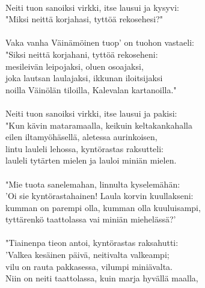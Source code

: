                                                                 \\
Neiti tuon sanoiksi virkki, itse lausui ja kysyvi:              \\
"Miksi neittä korjahasi, tyttöä rekosehesi?"                    \\
                                                                \\
Vaka vanha Väinämöinen tuop' on tuohon vastaeli:                \\
"Siksi neittä korjahani, tyttöä rekoseheni:                     \\
mesileivän leipojaksi, oluen osoajaksi,                         \\
joka lautsan laulajaksi, ikkunan iloitsijaksi                   \\
noilla Väinölän tiloilla, Kalevalan kartanoilla."               \\
                                                                \\
Neiti tuon sanoiksi virkki, itse lausui ja pakisi:              \\
"Kun kävin mataramaalla, keikuin keltakankahalla                \\
eilen iltamyöhäsellä, aletessa aurinkoisen,                     \\
lintu lauleli lehossa, kyntörastas raksutteli:                  \\
lauleli tytärten mielen ja lauloi miniän mielen.                \\
                                                                \\
"Mie tuota sanelemahan, linnulta kyselemähän:                   \\
'Oi sie kyntörastahainen! Laula korvin kuullakseni:             \\
kumman on parempi olla, kumman olla kuuluisampi,                \\
tyttärenkö taattolassa vai miniän miehelässä?'                  \\
                                                                \\
"Tiainenpa tieon antoi, kyntörastas raksahutti:                 \\
'Valkea kesäinen päivä, neitivalta valkeampi;                   \\
vilu on rauta pakkasessa, vilumpi miniävalta.                   \\
Niin on neiti taattolassa, kuin marja hyvällä maalla,           \\
